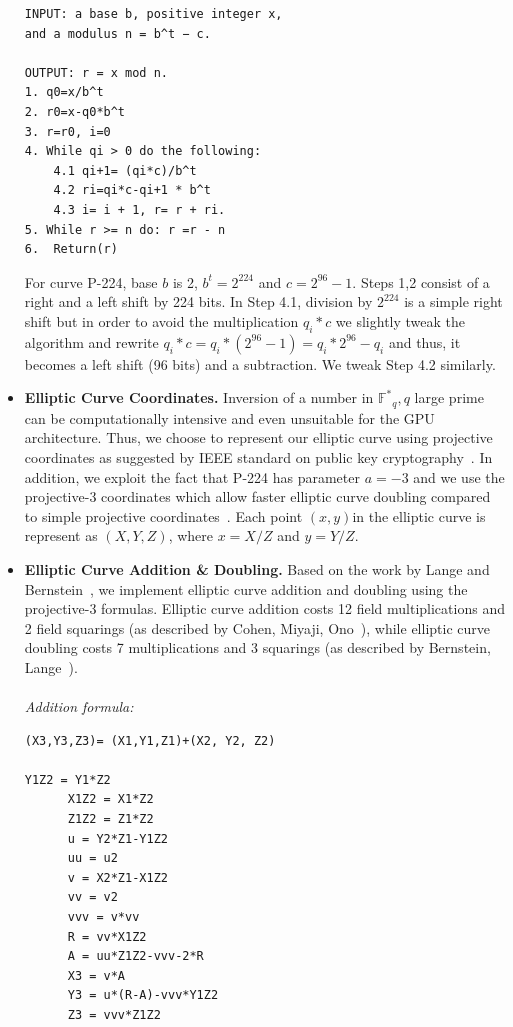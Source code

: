 \documentclass[11pt,twocolumn]{IEEEtran}
\begin{document}
\begin{itemize}
\small
\begin{verbatim}
INPUT: a base b, positive integer x, 
and a modulus n = b^t − c. 

OUTPUT: r = x mod n.
1. q0=x/b^t   
2. r0=x-q0*b^t   
3. r=r0, i=0 
4. While qi > 0 do the following:
	4.1 qi+1= (qi*c)/b^t   
	4.2 ri=qi*c-qi+1 * b^t 
	4.3 i= i + 1, r= r + ri.
5. While r >= n do: r =r - n
6.  Return(r)

\end{verbatim}
\normalsize
For curve P-224, base $b$ is 2, $b^t=2^{224}$ and $c=2^{96}-1$. Steps 1,2 consist of a right and a left shift by 224 bits. In Step 4.1, division by $2^{224}$ is a simple right shift but in order to avoid the multiplication $q_i*c$ we slightly tweak the algorithm and rewrite $q_i*c=q_i*(2^{96}-1)=q_i*2^{96} - q_i $ and thus, it becomes a left shift (96 bits) and a subtraction. We tweak Step 4.2 similarly.
\item \textbf{Elliptic Curve Coordinates.} Inversion of a number in $\mathbb{F^*}_q,q$ large prime can be computationally intensive and even unsuitable for the GPU architecture. Thus, we choose to represent our elliptic curve using projective coordinates as suggested by IEEE standard on public key cryptography~\cite{cryptostandard}. In addition, we exploit the fact that P-224 has parameter $a=-3$ and we use the projective-3 coordinates which allow faster elliptic curve doubling compared to simple projective coordinates~\cite{efd}. Each point $(x,y)$in the elliptic curve is represent as $(X, Y, Z)$, where $x=X/Z$ and $y=Y/Z$.
\item \textbf{Elliptic Curve Addition \& Doubling.} Based on the work by Lange and Bernstein~\cite{scalar}, we implement elliptic curve addition and doubling using the projective-3 formulas. Elliptic curve addition costs 12 field multiplications and 2 field squarings (as described by Cohen, Miyaji, Ono~\cite{cohen}), while elliptic curve doubling costs 7 multiplications and 3 squarings (as described by Bernstein, Lange~\cite{efd}).\\\\
\normalsize
\emph{Addition formula:}
\small
\begin{verbatim}
(X3,Y3,Z3)= (X1,Y1,Z1)+(X2, Y2, Z2)

Y1Z2 = Y1*Z2
      X1Z2 = X1*Z2
      Z1Z2 = Z1*Z2
      u = Y2*Z1-Y1Z2
      uu = u2
      v = X2*Z1-X1Z2
      vv = v2
      vvv = v*vv
      R = vv*X1Z2
      A = uu*Z1Z2-vvv-2*R
      X3 = v*A
      Y3 = u*(R-A)-vvv*Y1Z2
      Z3 = vvv*Z1Z2


\end{verbatim}
\end{itemize}
\end{document}

